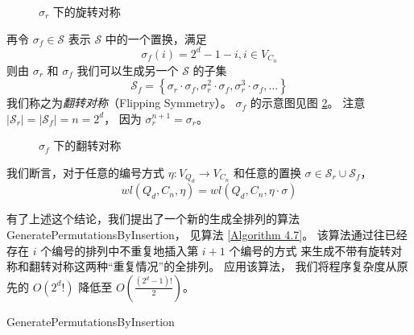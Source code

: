 \begin{figure}[h!]
	\centering
	
	\caption{$\sigma_r$ 下的旋转对称}
	\label{Figure 4-1}
\end{figure}

再令 $\sigma_f \in \mathcal{S}$ 表示 $\mathcal{S}$ 中的一个置换，满足
\begin{equation*}
\sigma_f(i) = 2^d - 1 - i, i \in V_{C_n}
\end{equation*}
则由 $\sigma_r$ 和 $\sigma_f$ 我们可以生成另一个 $\mathcal{S}$ 的子集
\begin{equation*}
\mathcal{S}_f = \left\{\sigma_r \cdot \sigma_f, \sigma_r^2 \cdot \sigma_f, \sigma_r^3 \cdot \sigma_f, \dots\right\}
\end{equation*}
我们称之为\emph{翻转对称}（Flipping Symmetry）。
$\sigma_f$ 的示意图见图 \ref{Figure 4-2}。
注意 $|\mathcal{S}_r| = |\mathcal{S}_f| = n = 2^d$，
因为 $\sigma_r^{n + 1} = \sigma_r$。

\begin{figure}[h!]
	\centering
	
	\caption{$\sigma_f$ 下的翻转对称}
	\label{Figure 4-2}
\end{figure}

我们断言，对于任意的编号方式 $\eta \colon V_{Q_d} \rightarrow V_{C_n}$
和任意的置换 $\sigma \in \mathcal{S}_r \cup \mathcal{S}_f$，
\begin{equation*}
wl(Q_d, C_n, \eta) = wl(Q_d, C_n, \eta \cdot \sigma)
\end{equation*}

有了上述这个结论，我们提出了一个新的生成全排列的算法 GeneratePermutationsByInsertion，
见算法 \ref{Algorithm 4.7}。
该算法通过往已经存在 $i$ 个编号的排列中不重复地插入第 $i + 1$ 个编号的方式
来生成不带有旋转对称和翻转对称这两种“重复情况”的全排列。
应用该算法，
我们将程序复杂度从原先的 $O\left(2^d !\right)$ 降低至 $O\left(\frac{(2^d - 1)!}{2}\right)$。

\begin{algorithm}[h!]
\caption{GeneratePermutationsByInsertion}
\label{Algorithm 4.7}
\begin{algorithmic}[1]
	 
	 

		 
	\Else
			 
				 
			\EndIf
		\EndFor
	\EndIf
\end{algorithmic}
\end{algorithm}

